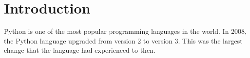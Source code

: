 \section{Introduction}
Python is one of the most popular programming languages in the world. In 2008, the Python language upgraded from version 2 to version 3. This was the largest change that the language had experienced to then.